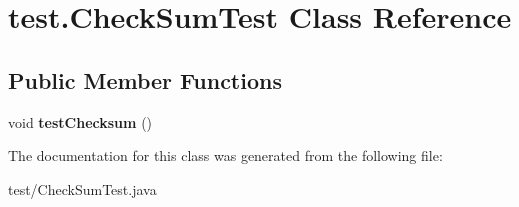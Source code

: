\hypertarget{classtest_1_1_check_sum_test}{
\section{test.\-Check\-Sum\-Test \-Class \-Reference}
\label{classtest_1_1_check_sum_test}
}
\subsection*{\-Public \-Member \-Functions}
\begin{DoxyCompactItemize}
\item 
\hypertarget{classtest_1_1_check_sum_test_a65144fe6bc9b29ee32798a66d9663496}{
void {\bfseries test\-Checksum} ()}
\label{classtest_1_1_check_sum_test_a65144fe6bc9b29ee32798a66d9663496}

\end{DoxyCompactItemize}


\-The documentation for this class was generated from the following file\-:\begin{DoxyCompactItemize}
\item 
test/\-Check\-Sum\-Test.\-java\end{DoxyCompactItemize}
